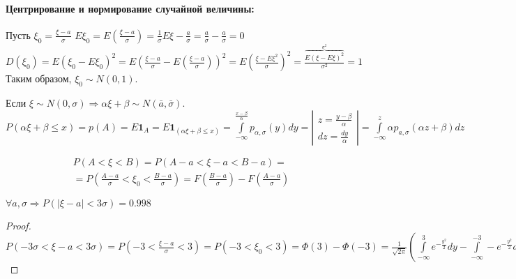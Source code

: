 \paragraph{Центрирование и нормирование случайной величины:}
Пусть $\xi_0 = \frac{\xi-a}{\sigma}$
$E\xi_0 = E\left(\frac{\xi-a}{\sigma}\right)=\frac{1}{\sigma}E\xi-\frac{a}{\sigma}=\frac{a}{\sigma}-\frac{a}{\sigma}=0$\\
$D(\xi_0)=E(\xi_0-E\xi_0)^2 = E\left(\frac{\xi-a}{\sigma}-E\left(\frac{\xi-a}{\sigma}\right)\right)^2 = E\left(\frac{\xi-E\xi^2}{\sigma}\right)^2 = \frac{\overbrace{E(\xi - E\xi)^2}^{\sigma^2}}{\sigma^2}=1$\\
Таким образом, $\xi_0 \sim N(0, 1)$.

\begin{example}
  Если $\xi\sim N(0, \sigma) \Rightarrow \alpha\xi + \beta \sim N(\bar{a}, \bar{\sigma})$.\\
  $P(\alpha\xi+\beta\leqslant x)=p(A)=E\textbf{1}_A=E\textbf{1}_{(\alpha\xi+\beta \leqslant x)}=\int\limits_{-\infty}^{\frac{x-\beta}{\alpha}} p_{\alpha, \sigma}(y)dy=\left|\begin{matrix}z=\frac{y-\beta}{\alpha}\\dz=\frac{dy}{\alpha}\end{matrix}\right|=\int\limits_{-\infty}^z \alpha p_{a,\sigma}(\alpha z+\beta)dz$
\end{example}

\begin{multline*}
  P(A < \xi < B) = P(A-a<\xi-a<B-a)=\\
  =P\left(\frac{A-a}{\sigma}<\xi_0<\frac{B-a}{\sigma}\right)=F\left(\frac{B-a}{\sigma}\right)-F\left(\frac{A-a}{\sigma}\right)
\end{multline*}

\begin{proposition}
  $\forall a,\sigma \Rightarrow P(|\xi-a|<3\sigma) = 0.998$\\
\end{proposition}

\begin{proof}
  $P(-3\sigma<\xi-a<3\sigma)=P\left(-3<\frac{\xi-a}{\sigma}<3\right)=P(-3<\xi_0<3)=\Phi(3)-\Phi(-3)=\frac{1}{\sqrt{2\pi}}\left(\int\limits_{-\infty}^3 e^{-\frac{y^2}{2}}dy - \int\limits_{-\infty}^{-3} -e^{-\frac{y^2}{2}}dy\right) = \frac{1}{\sqrt{2\pi}}\left(\int\limits_{-3}^3 e^{-\frac{y^2}{2}}dy\right)\approx\frac{1}{2\pi}\cdot 2.49986 \approx 0.998$
\end{proof}
